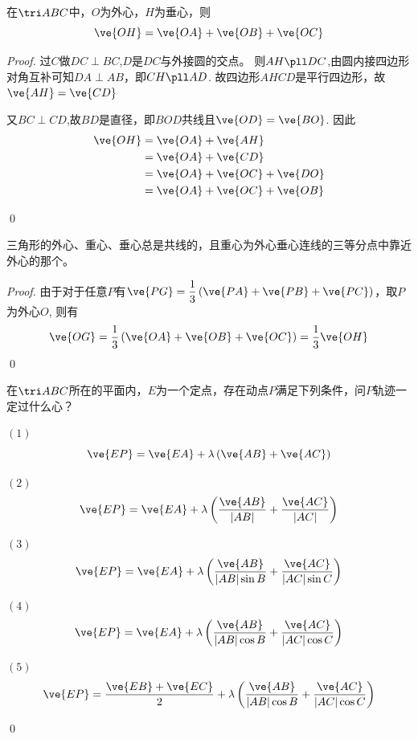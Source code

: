 \begin{lemma}在\(\tri ABC\)中，\(O\)为外心，\(H\)为垂心，则
    \begin{equation}
        \ve{OH}=\ve{OA}+\ve{OB}+\ve{OC}
    \end{equation}
\end{lemma}
\begin{proof}
    过\(C\)做\(DC\perp BC\),\(D\)是\(DC\)与外接圆的交点。
    则\(AH\pll DC\),由圆内接四边形对角互补可知\(DA\perp AB\)，即\(CH\pll AD\).
    故四边形\(AHCD\)是平行四边形，故\(\ve{AH}=\ve{CD}\)

    又\(BC\perp CD\),故\(BD\)是直径，即\(BOD\)共线且\(\ve{OD}=\ve{BO}\).
    因此\begin{align*}
        \ve{OH}&=\ve{OA}+\ve{AH}\\
               &=\ve{OA}+\ve{CD}\\
               &=\ve{OA}+\ve{OC}+\ve{DO}\\
               &=\ve{OA}+\ve{OC}+\ve{OB}
    \end{align*}


    \qed
\end{proof}
\begin{theorem}[Euler线]
    三角形的外心、重心、垂心总是共线的，且重心为外心垂心连线的三等分点中靠近外心的那个。 
\end{theorem}
\begin{proof}
    由于对于任意\(P\)有\(\ve{PG}=\dfrac{1}{3}\left(\ve{PA}+\ve{PB}+\ve{PC}\right)\)，取\(P\)为外心\(O\),
    则有\[\ve{OG}=\frac{1}{3}\left(\ve{OA}+\ve{OB}+\ve{OC}\right)=\dfrac{1}{3}\ve{OH}\]
    \qed
\end{proof}


\begin{example}
    在\(\tri ABC\)所在的平面内，\(E\)为一个定点，存在动点\(P\)满足下列条件，问\(P\)轨迹一定过什么心？

    \((1)\)\[\ve{EP}=\ve{EA}+\lambda\left(\ve{AB}+\ve{AC}\right)\]

    \((2)\)\[\ve{EP}=\ve{EA}+\lambda\left(\frac{\ve{AB}}{|AB|}+\frac{\ve{AC}}{|AC|}\right)\]

    \((3)\)\[\ve{EP}=\ve{EA}+\lambda\left(\frac{\ve{AB}}{|AB|\sin B}+\frac{\ve{AC}}{|AC|\sin C}\right)\]

    \((4)\)\[\ve{EP}=\ve{EA}+\lambda\left(\frac{\ve{AB}}{|AB|\cos B}+\frac{\ve{AC}}{|AC|\cos C}\right)\]

    \((5)\)\[\ve{EP}=\dfrac{\ve{EB}+\ve{EC}}{2}+\lambda\left(\frac{\ve{AB}}{|AB|\cos B}+\frac{\ve{AC}}{|AC|\cos C}\right)\]
\end{example}
\begin{jie}
    \qed
\end{jie}





















